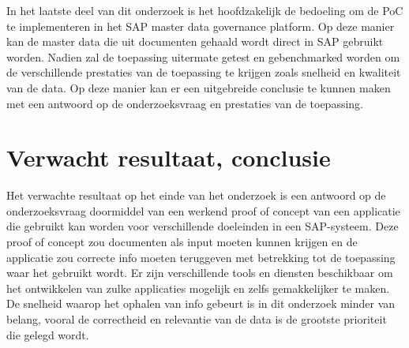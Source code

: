 In het laatste deel van dit onderzoek is het hoofdzakelijk de bedoeling om de PoC te implementeren in het SAP master data governance platform. Op deze manier kan de master data die uit documenten gehaald wordt direct in SAP gebruikt worden. Nadien zal de toepassing uitermate getest en gebenchmarked worden om de verschillende prestaties van de toepassing te krijgen zoals snelheid en kwaliteit van de data. Op deze manier kan er een uitgebreide conclusie te kunnen maken met een antwoord op de onderzoeksvraag en prestaties van de toepassing.

\section{Verwacht resultaat, conclusie}%
\label{sec:verwachte_resultaten}

%
%

Het verwachte resultaat op het einde van het onderzoek is een antwoord op de onderzoeksvraag doormiddel van een werkend proof of concept van een applicatie die gebruikt kan worden voor verschillende doeleinden in een SAP-systeem. Deze proof of concept zou documenten als input moeten kunnen krijgen en de applicatie zou correcte info moeten teruggeven met betrekking tot de toepassing waar het gebruikt wordt. Er zijn verschillende tools en diensten beschikbaar om het ontwikkelen van zulke applicaties mogelijk en zelfs gemakkelijker te maken. De snelheid waarop het ophalen van info gebeurt is in dit onderzoek minder van belang, vooral de correctheid en relevantie van de data is de grootste prioriteit die gelegd wordt.
